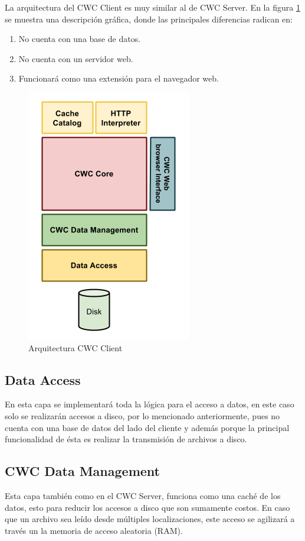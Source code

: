 La arquitectura del CWC Client es muy similar al de CWC Server. En la figura \ref{ArquitecturaCWCClient} se muestra una descripción gráfica, donde las principales diferencias radican en:

\begin{enumerate}
\item No cuenta con una base de datos.
\item No cuenta con un servidor web. 
\item Funcionará como una extensión para el navegador web. 
\end{enumerate}

\begin{figure}
  \centering
    \includegraphics[scale=0.75]{gfx/ArquitecturaCWCClient}
  \caption{Arquitectura CWC Client}
  \label{ArquitecturaCWCClient}
\end{figure}

\subsection{Data Access}
En esta capa se implementará toda la lógica para el acceso a datos, en este caso solo se realizarán accesos a disco, por lo mencionado anteriormente, pues no cuenta con una base de datos del lado del cliente y además porque la principal funcionalidad de ésta es realizar la transmisión de archivos a disco. 

\subsection{CWC Data Management}
Esta capa también como en el CWC Server, funciona como una caché de los datos, esto para reducir los accesos a disco que son sumamente costos.
En caso que un archivo sea leído desde múltiples localizaciones, este acceso se agilizará a través un la memoria de acceso aleatoria (RAM).

